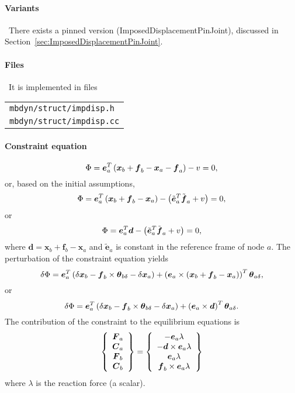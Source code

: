 \documentclass[10pt,dvips,fleqn]{report}
\newcommand{\T}[1]{\boldsymbol{#1}}
\begin{document}
\paragraph{Variants} \
There exists a pinned version (ImposedDisplacementPinJoint),
discussed in Section~\ref{sec:ImposedDisplacementPinJoint}.

\paragraph{Files} \
It is implemented in files

\begin{tabular}{l}
\texttt{mbdyn/struct/impdisp.h} \\
\texttt{mbdyn/struct/impdisp.cc}
\end{tabular}

\paragraph{Constraint equation}
\begin{equation}
	\Phi = \T{e}_a^T \plbr{\T{x}_b + \T{f}_b - \T{x}_a - \T{f}_a} - v = 0 ,
\end{equation}
or, based on the initial assumptions,
\begin{equation}
	\Phi = \T{e}_a^T \plbr{\T{x}_b + \T{f}_b - \T{x}_a}
		- \plbr{\tilde{\T{e}}_a^T \tilde{\T{f}}_a + v} = 0 ,
\end{equation}
or
\begin{equation}
	\Phi = \T{e}_a^T \T{d}
		- \plbr{\tilde{\T{e}}_a^T \tilde{\T{f}}_a + v} = 0 ,
\end{equation}
where $\T{d}=\T{x}_b + \T{f}_b - \T{x}_a$ 
and $\tilde{\T{e}}_a$ is constant in the reference frame of node $a$.
The perturbation of the constraint equation yields
\begin{equation}
	\delta\Phi = 
		\T{e}_a^T \plbr{\delta\T{x}_b
		- \T{f}_b\times\T{\theta}_{b\delta}
		- \delta\T{x}_a
		} + \plbr{\T{e}_a \times \plbr{
			\T{x}_b + \T{f}_b - \T{x}_a
		}}^T \T{\theta}_{a\delta} ,
\end{equation}
or
\begin{equation}
	\delta\Phi = 
		\T{e}_a^T \plbr{\delta\T{x}_b
		- \T{f}_b\times\T{\theta}_{b\delta}
		- \delta\T{x}_a
		} + \plbr{\T{e}_a \times \T{d}}^T \T{\theta}_{a\delta} .
\end{equation}
The contribution of the constraint to the equilibrium equations is
\begin{equation}
	\cubr{\cvvect{
		\T{F}_a \\
		\T{C}_a \\
		\T{F}_b \\
		\T{C}_b
	}} = \cubr{\cvvect{
		- \T{e}_a \lambda \\
		- \T{d} \times \T{e}_a \lambda \\
		\T{e}_a \lambda \\
		\T{f}_b \times \T{e}_a \lambda
	}}
\end{equation}
where $\lambda$ is the reaction force (a scalar).
\end{document}
